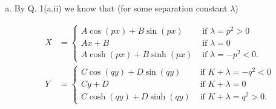 \documentclass[12pt]{article}
\begin{document}
\iffalse
\begin{answer}
\begin{enumerate}[(a)]
\item By Q. 1(a.ii) we know that (for some separation constant $\lambda$)

\begin{align*}
X&=\begin{cases}
A\cos(px)+B\sin(px)&\mbox{ if }\lambda=p^2>0\\
Ax+B&\mbox{ if }\lambda=0\\
A\cosh(px)+B\sinh(px)&\mbox{ if }\lambda=-p^2<0.
\end{cases}\\
Y&=\begin{cases}
C\cos(qy)+D\sin(qy)&\mbox{ if }K+\lambda=-q^2<0\\
Cy+D&\mbox{ if }K+\lambda=0\\
C\cosh(qy)+D\sinh(qy)&\mbox{ if }K+\lambda=q^2>0.
\end{cases}
\end{align*}


\end{enumerate}
\end{answer}
\end{document}
